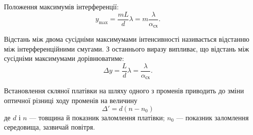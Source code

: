 %
%
%
%

Положення максимумів інтерференції:
\begin{equation}
	y_{\max} = \frac{{mL}}{d}\lambda = m\frac\lambda{\alpha_\text{сх}}.
\end{equation}

Відстань між двома сусідніми максимумами інтенсивності називається відстанню між інтерференційними смугами.  З останнього виразу випливає, що відстань між сусідніми максимумами дорівнюватиме:
\begin{equation}\label{eq:widthofmax}
	\Delta y = \frac{L}{d}\lambda = \frac\lambda{\alpha_\text{сх}}.
\end{equation}


Встановлення скляної платівки на шляху одного з променів
приводить до зміни оптичної різниці ходу променів на величину
\begin{equation*}
	\Delta' = d (n - n_0)
\end{equation*}
де $d$ і $n$ --- товщина й показник заломлення платівки; $n_0$ --- показник
заломлення середовища, зазвичай повітря.



